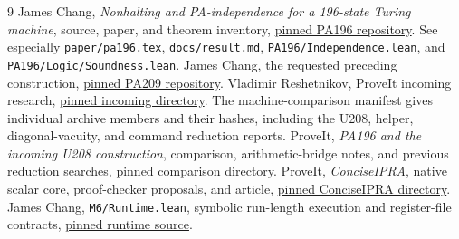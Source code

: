 \documentclass[11pt,letterpaper]{article}
\newcommand{\code}[1]{\texttt{\nolinkurl{#1}}}
\begin{document}
\clearpage
\begin{thebibliography}{9}
 James Chang, \emph{Nonhalting and PA-independence for a
196-state Turing machine}, source, paper, and theorem inventory,
\href{https://github.com/jamesyc/BusyBeaver/tree/407cdc356f6b586635e71ac92be394255f4bfea4}{pinned PA196 repository}.
See especially \code{paper/pa196.tex}, \code{docs/result.md},
\code{PA196/Independence.lean}, and \code{PA196/Logic/Soundness.lean}.
 James Chang, the requested preceding construction,
\href{https://github.com/jamesyc/BusyBeaver/tree/69d98241a721ead20b4f0b17df9062950b40fbfe}{pinned PA209 repository}.
 Vladimir Reshetnikov, ProveIt incoming research,
\href{https://github.com/VladimirReshetnikov/ProveIt/tree/dc523e7b06ffb414093c90aa035500ca283e5f75/docs/incoming}{pinned incoming directory}.
The machine-comparison manifest gives individual archive members and
their hashes, including the U208, helper, diagonal-vacuity, and command
reduction reports.
 ProveIt, \emph{PA196 and the incoming U208
construction}, comparison, arithmetic-bridge notes, and previous
reduction searches,
\href{https://github.com/VladimirReshetnikov/ProveIt/tree/dc523e7b06ffb414093c90aa035500ca283e5f75/Computability/BusyBeaver/Research/PA/pa196-vs-u208}{pinned comparison directory}.
 ProveIt, \emph{ConciseIPRA}, native scalar core,
proof-checker proposals, and article,
\href{https://github.com/VladimirReshetnikov/ProveIt/tree/dc523e7b06ffb414093c90aa035500ca283e5f75/Logic/PrimitiveRecursiveArithmetic/ConciseIPRA}{pinned ConciseIPRA directory}.
 James Chang, \code{M6/Runtime.lean}, symbolic
run-length execution and register-file contracts,
\href{https://github.com/jamesyc/BusyBeaver/blob/407cdc356f6b586635e71ac92be394255f4bfea4/M6/Runtime.lean}{pinned runtime source}.
\end{thebibliography}
\end{document}

